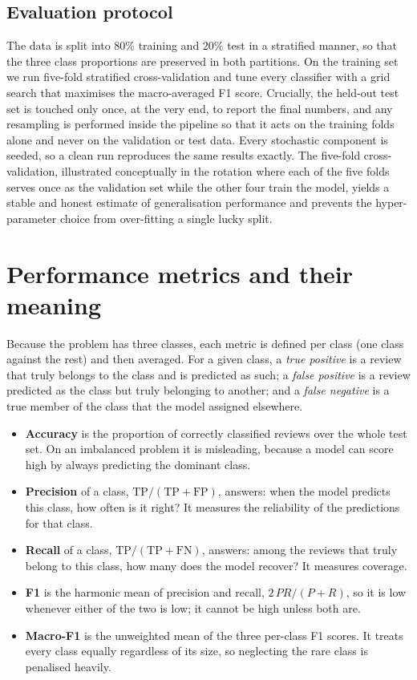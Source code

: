 \documentclass[11pt,a4paper]{article}
\begin{document}
\subsection{Evaluation protocol}
The data is split into $80\%$ training and $20\%$ test in a stratified manner, so that
the three class proportions are preserved in both partitions. On the training set we run
five-fold stratified cross-validation and tune every classifier with a grid search that
maximises the macro-averaged F1 score. Crucially, the held-out test set is touched only
once, at the very end, to report the final numbers, and any resampling is performed
inside the pipeline so that it acts on the training folds alone and never on the
validation or test data. Every stochastic component is seeded, so a clean run reproduces
the same results exactly. The five-fold cross-validation, illustrated conceptually in
the rotation where each of the five folds serves once as the validation set while the
other four train the model, yields a stable and honest estimate of generalisation
performance and prevents the hyper-parameter choice from over-fitting a single lucky
split.

\section{Performance metrics and their meaning}
\label{sec:metrics}
Because the problem has three classes, each metric is defined per class (one class
against the rest) and then averaged. For a given class, a \emph{true positive} is a
review that truly belongs to the class and is predicted as such; a \emph{false
positive} is a review predicted as the class but truly belonging to another; and a
\emph{false negative} is a true member of the class that the model assigned elsewhere.

\begin{itemize}[leftmargin=1.4em,itemsep=2pt]
\item \textbf{Accuracy} is the proportion of correctly classified reviews over the whole
test set. On an imbalanced problem it is misleading, because a model can score high by
always predicting the dominant class.
\item \textbf{Precision} of a class, $\text{TP}/(\text{TP}+\text{FP})$, answers: when the
model predicts this class, how often is it right? It measures the reliability of the
predictions for that class.
\item \textbf{Recall} of a class, $\text{TP}/(\text{TP}+\text{FN})$, answers: among the
reviews that truly belong to this class, how many does the model recover? It measures
coverage.
\item \textbf{F1} is the harmonic mean of precision and recall,
$2\,PR/(P+R)$, so it is low whenever either of the two is low; it cannot be high unless
both are.
\item \textbf{Macro-F1} is the unweighted mean of the three per-class F1 scores. It
treats every class equally regardless of its size, so neglecting the rare class is
penalised heavily.
\end{itemize}
\end{document}

